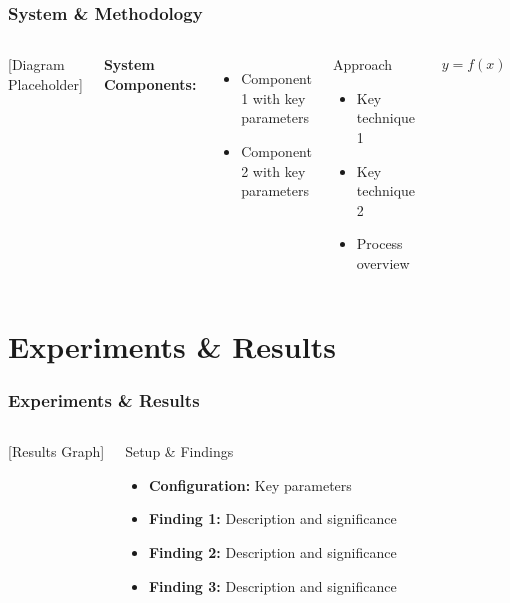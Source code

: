 \documentclass[
    9pt,
    aspectratio=169,
]{beamer}
\begin{document}
\begin{frame}
\frametitle{System \& Methodology}
\begin{columns}
\begin{center}
[Diagram Placeholder]
\end{center}

\textbf{System Components:}
\begin{itemize}
    \item Component 1 with key parameters
    \item Component 2 with key parameters
\end{itemize}

\begin{block}{Approach}
    \begin{itemize}
        \item Key technique 1
        \item Key technique 2
        \item Process overview
    \end{itemize}
\end{block}

\begin{align}
    y = f(x)  %
\end{align}
\end{columns}
\end{frame}

\section{Experiments \& Results}

\begin{frame}
\frametitle{Experiments \& Results}
\begin{columns}
\begin{center}
[Results Graph]
\end{center}

\begin{block}{Setup \& Findings}
    \begin{itemize}
        \item \textbf{Configuration:} Key parameters
        \item \textbf{Finding 1:} Description and significance
        \item \textbf{Finding 2:} Description and significance
        \item \textbf{Finding 3:} Description and significance
    \end{itemize}
\end{block}
\end{columns}
\end{frame}
\end{document}

